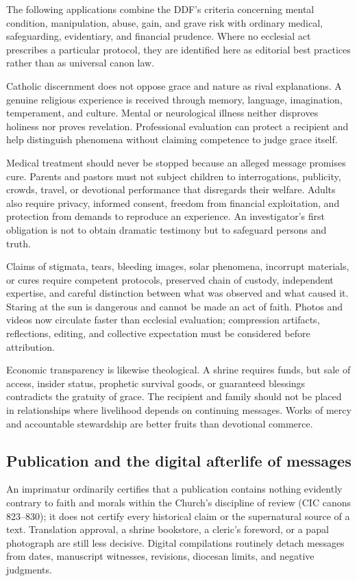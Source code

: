 The following applications combine the DDF's criteria concerning mental condition, manipulation, abuse, gain, and grave risk with ordinary medical, safeguarding, evidentiary, and financial prudence. Where no ecclesial act prescribes a particular protocol, they are identified here as editorial best practices rather than as universal canon law.

Catholic discernment does not oppose grace and nature as rival explanations. A genuine religious experience is received through memory, language, imagination, temperament, and culture. Mental or neurological illness neither disproves holiness nor proves revelation. Professional evaluation can protect a recipient and help distinguish phenomena without claiming competence to judge grace itself.

Medical treatment should never be stopped because an alleged message promises cure. Parents and pastors must not subject children to interrogations, publicity, crowds, travel, or devotional performance that disregards their welfare. Adults also require privacy, informed consent, freedom from financial exploitation, and protection from demands to reproduce an experience. An investigator's first obligation is not to obtain dramatic testimony but to safeguard persons and truth.

Claims of stigmata, tears, bleeding images, solar phenomena, incorrupt materials, or cures require competent protocols, preserved chain of custody, independent expertise, and careful distinction between what was observed and what caused it. Staring at the sun is dangerous and cannot be made an act of faith. Photos and videos now circulate faster than ecclesial evaluation; compression artifacts, reflections, editing, and collective expectation must be considered before attribution.

Economic transparency is likewise theological. A shrine requires funds, but sale of access, insider status, prophetic survival goods, or guaranteed blessings contradicts the gratuity of grace. The recipient and family should not be placed in relationships where livelihood depends on continuing messages. Works of mercy and accountable stewardship are better fruits than devotional commerce.

\subsection{Publication and the digital afterlife of messages}

An imprimatur ordinarily certifies that a publication contains nothing evidently contrary to faith and morals within the Church's discipline of review (CIC canons 823--830); it does not certify every historical claim or the supernatural source of a text. Translation approval, a shrine bookstore, a cleric's foreword, or a papal photograph are still less decisive. Digital compilations routinely detach messages from dates, manuscript witnesses, revisions, diocesan limits, and negative judgments.

